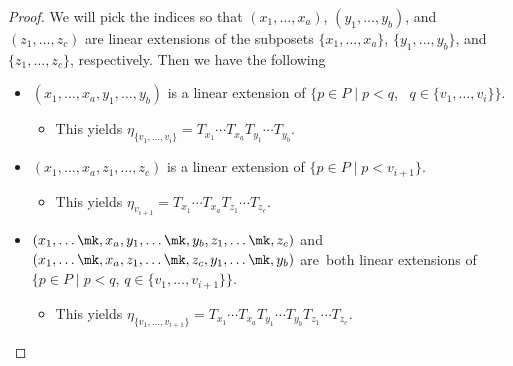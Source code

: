 \begin{proof}
We will pick the indices so that $(x_1,\dots, x_a)$, $(y_1,\dots,y_b)$, and $(z_1,\dots,z_c)$ are linear extensions of the subposets $\{x_1,\dots,x_a\}$, $\{y_1,\dots,y_b\}$, and $\{z_1,\dots,z_c\}$, respectively. Then we have the following
\begin{itemize}
\item $(x_1,\dots,x_a,y_1,\dots,y_b)$ is a linear extension of $\big\{p\in P\;|\; p<q$, \ $q\in\{v_1,\dots, v_i\}\big\}$.
\begin{itemize}
\item This yields $\eta_{\{v_1,\dots,v_i\}}=T_{x_1}\cdots T_{x_a}T_{y_1}\cdots T_{y_b}$.
\end{itemize}
\item $(x_1,\dots,x_a,z_1,\dots,z_c)$ is a linear extension of $\{p\in P \;|\; p<v_{i+1}\}$.
\begin{itemize}
\item This yields $\eta_{v_{i+1}}=T_{x_1}\cdots T_{x_a}T_{z_1}\cdots T_{z_c}$.
\end{itemize}
\item $(x_1,\dots\mk,x_a,y_1,\dots\mk,y_b,z_1,\dots\mk,z_c)$ and 
$(x_1,\dots\mk,x_a,z_1,\dots\mk,z_c,y_1,\dots\mk,y_b)$ are~both linear extensions of $\big\{p\in P \;|\; p<q$, $q\in\{v_1,\dots, v_{i+1}\}\big\}$.
\begin{itemize}
\item This yields $\eta_{\{v_1,\dots,v_{i+1}\}}=T_{x_1}\cdots T_{x_a}T_{y_1}\cdots T_{y_b}T_{z_1}\cdots T_{z_c}$.
\end{itemize}
\end{itemize}


\end{proof}
